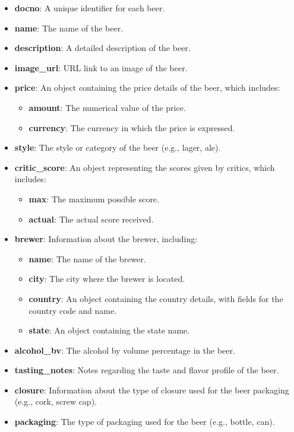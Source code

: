 \begin{itemize}
  \item \textbf{docno}: A unique identifier for each beer.
  \item \textbf{name}: The name of the beer.
  \item \textbf{description}: A detailed description of the beer.
  \item \textbf{image\_url}: URL link to an image of the beer.
  \item \textbf{price}: An object containing the price details of the beer, which includes:
        \begin{itemize}
          \item \textbf{amount}: The numerical value of the price.
          \item \textbf{currency}: The currency in which the price is expressed.
        \end{itemize}
  \item \textbf{style}: The style or category of the beer (e.g., lager, ale).
  \item \textbf{critic\_score}: An object representing the scores given by critics, which includes:
        \begin{itemize}
          \item \textbf{max}: The maximum possible score.
          \item \textbf{actual}: The actual score received.
        \end{itemize}
  \item \textbf{brewer}: Information about the brewer, including:
        \begin{itemize}
          \item \textbf{name}: The name of the brewer.
          \item \textbf{city}: The city where the brewer is located.
          \item \textbf{country}: An object containing the country details, with fields for the country code and name.
          \item \textbf{state}: An object containing the state name.
        \end{itemize}
  \item \textbf{alcohol\_bv}: The alcohol by volume percentage in the beer.
  \item \textbf{tasting\_notes}: Notes regarding the taste and flavor profile of the beer.
  \item \textbf{closure}: Information about the type of closure used for the beer packaging (e.g., cork, screw cap).
  \item \textbf{packaging}: The type of packaging used for the beer (e.g., bottle, can).
\end{itemize}

